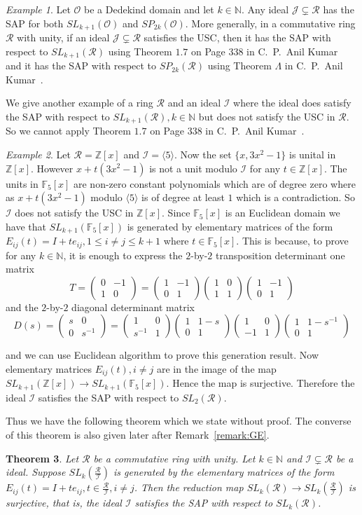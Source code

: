 \documentclass[12pt]{amsart}
\newcommand{\Gl}{\Lambda}
\newcommand{\sbnq}{\subsetneq}
\newcommand{\mbb}{\mathbb}
\newcommand{\mcl}{\mathcal}
\newcommand{\lra}{\longrightarrow}
\newcommand{\I}{\mcl I}
\newcommand{\N}{\mbb N}
\newcommand{\Z}{\mbb Z}
\newcommand{\R}{\mcl R}
\newcommand{\equ}[1]{%
\begin{equation*}
#1
\end{equation*}
}
\newcommand{\mattwo}[4]{%
\begin{pmatrix}
  #1 & #2\\ #3 & #4
\end{pmatrix}
}
\theoremstyle{plain}
\newtheorem{theorem}{Theorem}[section]
\theoremstyle{definition}
\theoremstyle{remark}
\newtheorem{example}[theorem]{Example}
\numberwithin{equation}{section}
\begin{document}
\begin{example}
	Let $\mcl{O}$ be a Dedekind domain and let $k\in \N$. Any ideal $\mcl{J}\sbnq \R$ has the SAP for both $SL_{k+1}(\mcl{O})$ and $SP_{2k}(\mcl{O})$. More generally, in a commutative ring $\R$ with unity, if an ideal $\mcl{J}\sbnq \R$ satisfies the USC, then it has the SAP with respect to $SL_{k+1}(\R)$ using Theorem $1.7$ on Page 338 in C.~P.~Anil Kumar~\cite{MR3887364} and it has the SAP with respect to $SP_{2k}(\R)$ using Theorem $\Gl$ in C.~P.~Anil Kumar~\cite{CPAKII}.   
\end{example}

We give another example of a ring $\R$ and an ideal $\I$ where the ideal does  satisfy the SAP with respect to $SL_{k+1}(\R),k\in \N$ but does not satisfy the USC in $\R$. So we cannot apply Theorem $1.7$ on Page $338$ in C.~P.~Anil Kumar~\cite{MR3887364}. 
\begin{example}
	\label{Example:NotUSC2} 
	Let $\R=\mbb{Z}[x]$ and $\I=\langle 5\rangle$. Now the set $\{x,3x^2-1\}$ is unital in $\Z[x]$. However $x+t(3x^2-1)$ is not a unit modulo $\I$ for any $t\in\Z[x]$. The units in $\mbb{F}_5[x]$ are non-zero constant polynomials which are of degree zero where as $x+t(3x^2-1)$ modulo $\langle 5\rangle$ is of degree at least $1$ which is a contradiction. So $\I$ does not satisfy the USC in $\Z[x]$.
	Since $\mbb{F}_5[x]$ is an Euclidean domain we have that $SL_{k+1}(\mbb{F}_5[x])$ is generated by elementary matrices of the form $E_{ij}(t)=I+te_{ij},1\leq i\neq j\leq k+1$ where $t\in \mbb{F}_5[x]$. This is because, to prove for any $k\in \N$, it is enough to express  the $2$-by-$2$ transposition determinant one matrix \equ{T=\mattwo 0{-1}10=\mattwo 1{-1}01\mattwo 1011\mattwo 1{-1}01} and the $2$-by-$2$ diagonal determinant matrix \equ{D(s)=\mattwo s00{s^{-1}}=\mattwo 10{s^{-1}}1\mattwo 1{1-s}01\mattwo 10{-1}1\mattwo 1{1-s^{-1}}01}
	and we can use Euclidean algorithm to prove this generation result. Now
	elementary matrices $E_{ij}(t),i\neq j$ are in the image of the map $SL_{k+1}(\Z[x]) \lra SL_{k+1}(\mbb{F}_5[x])$. Hence the map is surjective. Therefore the ideal $\I$ satisfies the SAP with respect to $SL_2(\R)$.
\end{example}
Thus we have the following theorem which we state without proof. The converse of this theorem is also given later after Remark~\ref{remark:GE}.
\begin{theorem}
	\label{theorem:SAP}
	Let $\R$ be a commutative ring with unity. Let $k\in \N$ and $\I\sbnq \R$ be a ideal.  Suppose $SL_k(\frac{\R}{\I})$ is generated by the elementary matrices of the form $E_{ij}(t)=I+te_{ij},t\in \frac{\R}{\I},i\neq j$. Then the reduction map $SL_k(\R)\lra SL_k(\frac{\R}{\I})$ is surjective, that is, the ideal $\I$ satisfies the SAP with respect to $SL_k(\R)$. 
\end{theorem}
\end{document}
